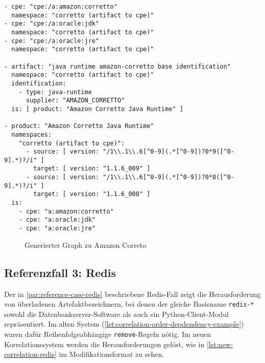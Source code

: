 \begin{lstlisting}[style=yaml,caption={Produktmodellierung zu Amazon Correto},label={lst:new-correlation-java-runtimes},basicstyle=\ttfamily\scriptsize]
- cpe: "cpe:/a:amazon:corretto"
  namespace: "corretto (artifact to cpe)"
- cpe: "cpe:/a:oracle:jdk"
  namespace: "corretto (artifact to cpe)"
- cpe: "cpe:/a:oracle:jre"
  namespace: "corretto (artifact to cpe)"

- artifact: "java runtime amazon-corretto base identification"
  namespace: "corretto (artifact to cpe)"
  identification:
    - type: java-runtime
      supplier: "AMAZON_CORRETTO"
  is: [ product: "Amazon Corretto Java Runtime" ]

- product: "Amazon Corretto Java Runtime"
  namespaces:
    "corretto (artifact to cpe)":
      - source: [ version: "/1\\.1\\.6[^0-9](.*[^0-9])?0*9([^0-9].*)?/i" ]
        target: [ version: "1.1.6_009" ]
      - source: [ version: "/1\\.1\\.6[^0-9](.*[^0-9])?0*8([^0-9].*)?/i" ]
        target: [ version: "1.1.6_008" ]
  is:
    - cpe: "a:amazon:corretto"
    - cpe: "a:oracle:jdk"
    - cpe: "a:oracle:jre"
\end{lstlisting}

\begin{figure}[htbp]
    \centering
    \makebox[\textwidth]{}
    \caption{Generierter Graph zu Amazon Correto}
    \label{fig:example-graph-java-runtimes}
\end{figure}

\subsection{Referenzfall 3: Redis}\label{subsec:example-redis}

Der in \autoref{par:reference-case-redis} beschriebene Redis-Fall zeigt die Herausforderung von überladenen Artefaktbezeichnern, bei denen der gleiche Basisname \texttt{redis-*} sowohl die Datenbankserver-Software als auch ein Python-Client-Modul repräsentiert.
Im alten System (\autoref{lst:correlation-order-depdendency-example}) waren dafür Reihenfolgeabhängige \texttt{remove}-Regeln nötig.
Im neuen Korrelationssystem werden die Herausforderungen gelöst, wie in \autoref{lst:new-correlation-redis} im Modifikationsformat zu sehen.


